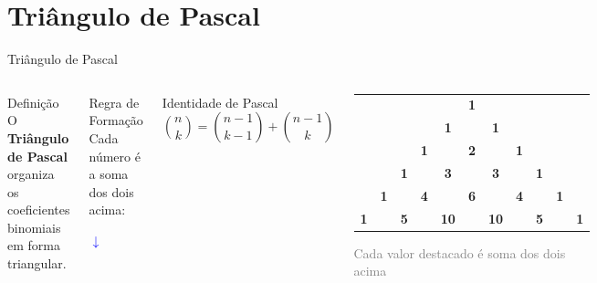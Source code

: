 \documentclass[9pt]{beamer}
\begin{document}
\section{Triângulo de Pascal}
\begin{frame}{Triângulo de Pascal}

\begin{columns}


\begin{block}{Definição}
O \textbf{Triângulo de Pascal} organiza os \alert{coeficientes binomiais} em forma triangular.
\end{block}

\vspace{0.3cm}

\begin{block}{Regra de Formação}
Cada número é a soma dos dois acima:
\begin{center}
\textcolor{blue}{\Large $\downarrow$}
\end{center}
\end{block}

\vspace{0.3cm}

\begin{alertblock}{Identidade de Pascal}
\[
\binom{n}{k} =
\binom{n-1}{k-1} +
\binom{n-1}{k}
\]
\end{alertblock}



\begin{center}
\setlength{\tabcolsep}{6pt}
\renewcommand{\arraystretch}{1.3}

\begin{tabular}{ccccccccccc}
      &   &   &   &   & \textbf{1} &   &   &   &   &   \\[2pt]
      &   &   &   & \textbf{1} &   & \textbf{1} &   &   &   &   \\[2pt]
      &   &   & \textbf{1} &   & \textbf{\color{blue}2} &   & \textbf{1} &   &   &   \\[2pt]
      &   & \textbf{1} &   & \textbf{3} &   & \textbf{3} &   & \textbf{1} &   &   \\[2pt]
      & \textbf{1} &   & \textbf{4} &   & \textbf{\color{red}6} &   & \textbf{4} &   & \textbf{1} &   \\[2pt]
\textbf{1} &   & \textbf{5} &   & \textbf{10} &   & \textbf{10} &   & \textbf{5} &   & \textbf{1} \\
\end{tabular}

\vspace{0.4cm}

\textcolor{gray}{\footnotesize Cada valor destacado é soma dos dois acima}
\end{center}

\end{columns}

\end{frame}
\end{document}

